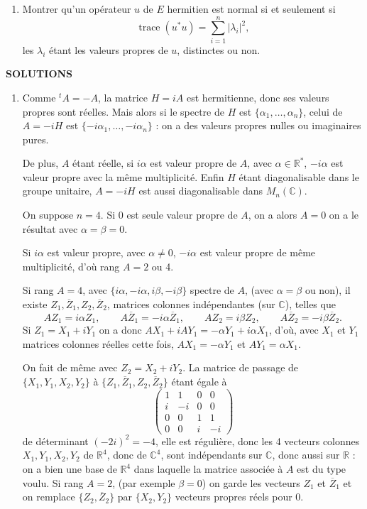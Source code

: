 \begin{enumerate}[label=\arabic*.,leftmargin=2.2em,itemsep=1.1em]
\item Montrer qu'un opérateur $u$ de $E$ hermitien est normal si et seulement si
\[
\operatorname{trace}(u^*u)=\sum_{i=1}^n|\lambda_i|^2,
\]
les $\lambda_i$ étant les valeurs propres de $u$, distinctes ou non.

\end{enumerate}

\clearpage
\begin{center}
{\Large\sffamily\bfseries\color{BellaLavenderDeep} SOLUTIONS}
\end{center}
\vspace{0.8em}

\begin{enumerate}[label=\arabic*.,leftmargin=2.2em,itemsep=1.15em]

\item Comme ${}^t\!A=-A$, la matrice $H=iA$ est hermitienne, donc ses valeurs propres sont réelles. Mais alors si le spectre de $H$ est $\{\alpha_1,\ldots,\alpha_n\}$, celui de $A=-iH$ est $\{-i\alpha_1,\ldots,-i\alpha_n\}$ : on a des valeurs propres nulles ou imaginaires pures.

De plus, $A$ étant réelle, si $i\alpha$ est valeur propre de $A$, avec $\alpha\in\mathbb R^*$, $-i\alpha$ est valeur propre avec la même multiplicité. Enfin $H$ étant diagonalisable dans le groupe unitaire, $A=-iH$ est aussi diagonalisable dans $M_n(\mathbb C)$.

On suppose $n=4$. Si 0 est seule valeur propre de $A$, on a alors $A=0$ on a le résultat avec $\alpha=\beta=0$.

Si $i\alpha$ est valeur propre, avec $\alpha\ne0$, $-i\alpha$ est valeur propre de même multiplicité, d'où rang $A=2$ ou 4.

Si rang $A=4$, avec $\{i\alpha,-i\alpha,i\beta,-i\beta\}$ spectre de $A$, (avec $\alpha=\beta$ ou non), il existe $Z_1,\overline Z_1,Z_2,\overline Z_2$, matrices colonnes indépendantes (sur $\mathbb C$), telles que
\[
AZ_1=i\alpha Z_1,
\qquad
A\overline Z_1=-i\alpha\overline Z_1,
\qquad
AZ_2=i\beta Z_2,
\qquad
A\overline Z_2=-i\beta\overline Z_2.
\]
Si $Z_1=X_1+iY_1$ on a donc $AX_1+iAY_1=-\alpha Y_1+i\alpha X_1$, d'où, avec $X_1$ et $Y_1$ matrices colonnes réelles cette fois, $AX_1=-\alpha Y_1$ et $AY_1=\alpha X_1$.

On fait de même avec $Z_2=X_2+iY_2$. La matrice de passage de $\{X_1,Y_1,X_2,Y_2\}$ à $\{Z_1,\overline Z_1,Z_2,\overline Z_2\}$ étant égale à
\[
\begin{pmatrix}
1&1&0&0\\
i&-i&0&0\\
0&0&1&1\\
0&0&i&-i
\end{pmatrix}
\]
de déterminant $(-2i)^2=-4$, elle est régulière, donc les 4 vecteurs colonnes $X_1,Y_1,X_2,Y_2$ de $\mathbb R^4$, donc de $\mathbb C^4$, sont indépendants sur $\mathbb C$, donc aussi sur $\mathbb R$ : on a bien une base de $\mathbb R^4$ dans laquelle la matrice associée à $A$ est du type voulu. Si rang $A=2$, (par exemple $\beta=0$) on garde les vecteurs $Z_1$ et $\overline Z_1$ et on remplace $\{Z_2,\overline Z_2\}$ par $\{X_2,Y_2\}$ vecteurs propres réels pour 0.


\end{enumerate}
